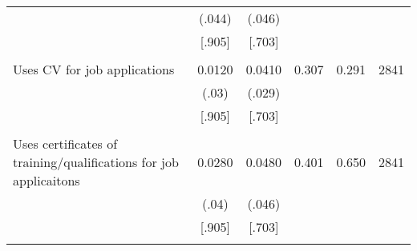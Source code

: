 \begin{tabular}{lccccc}
& (.044) & (.046) &  &  &  \\
& [.905] & [.703] &  &  &  \\
&  &  &  &  &  \\
Uses CV for job applications & 0.0120 & 0.0410 & 0.307 & 0.291 & 2841 \\
& (.03) & (.029) &  &  &  \\
& [.905] & [.703] &  &  &  \\
&  &  &  &  &  \\
Uses certificates of training/qualifications for job applicaitons & 0.0280 & 0.0480 & 0.401 & 0.650 & 2841 \\
& (.04) & (.046) &  &  &  \\
& [.905] & [.703] &  &  &  \\
&  &  &  &  &  \\ \hline
\end{tabular}
